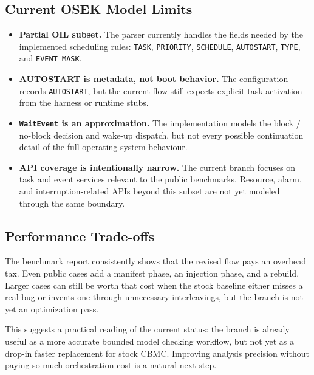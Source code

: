 \subsection{Current OSEK Model Limits}

\begin{itemize}[leftmargin=1.5em]
  \item \textbf{Partial OIL subset.} The parser currently handles the fields needed by the
  implemented scheduling rules: \texttt{TASK}, \texttt{PRIORITY}, \texttt{SCHEDULE},
  \texttt{AUTOSTART}, \texttt{TYPE}, and \texttt{EVENT\_MASK}.
  \item \textbf{AUTOSTART is metadata, not boot behavior.} The configuration records
  \texttt{AUTOSTART}, but the current flow still expects explicit task activation from the
  harness or runtime stubs.
  \item \textbf{\texttt{WaitEvent} is an approximation.} The implementation models the block /
  no-block decision and wake-up dispatch, but not every possible continuation detail of the
  full operating-system behaviour.
  \item \textbf{API coverage is intentionally narrow.} The current branch focuses on task and
  event services relevant to the public benchmarks. Resource, alarm, and interruption-related
  APIs beyond this subset are not yet modeled through the same boundary.
\end{itemize}

\subsection{Performance Trade-offs}

The benchmark report consistently shows that the revised flow pays an overhead tax. Even
public cases add a manifest phase, an injection phase, and a rebuild. Larger cases can still
be worth that cost when the stock baseline either misses a real bug or invents one through
unnecessary interleavings, but the branch is not yet an optimization pass.

This suggests a practical reading of the current status: the branch is already useful as a
more accurate bounded model checking workflow, but not yet as a drop-in faster replacement for
stock CBMC. Improving analysis precision without paying so much orchestration cost is a
natural next step.
